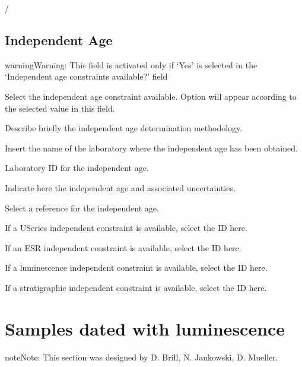 \documentclass[letterpaper,10pt,english]{sphinxmanual}
\begin{document}
 / 


\section{Independent Age}
\label{\detokenize{AAR:independent-age}}
\begin{sphinxadmonition}{warning}{Warning:}
This field is activated only if ‘Yes’ is selected in the ‘Independent age constraints available?’ field
\end{sphinxadmonition}

 \sphinxhyphen{} Select the independent age constraint available. Option will appear according to the selected value in this field.


 \sphinxhyphen{} Describe briefly the independent age determination methodology.

 \sphinxhyphen{} Insert the name of the laboratory where the independent age has been obtained.

 \sphinxhyphen{} Laboratory ID for the independent age.

 \sphinxhyphen{} Indicate here the independent age and associated uncertainties.

 \sphinxhyphen{} Select a reference for the independent age.

 \sphinxhyphen{} If a U\sphinxhyphen{}Series independent constraint is available, select the ID here.

 \sphinxhyphen{} If an ESR independent constraint is available, select the ID here.

 \sphinxhyphen{} If a luminescence independent constraint is available, select the ID here.

 \sphinxhyphen{} If a stratigraphic independent constraint is available, select the ID here.


\chapter{Samples dated with luminescence}
\label{\detokenize{Luminescence:samples-dated-with-luminescence}}\label{\detokenize{Luminescence::doc}}
\begin{sphinxadmonition}{note}{Note:}
This section was designed by D. Brill, N. Jankowski, D. Mueller.
\end{sphinxadmonition}
\end{document}
